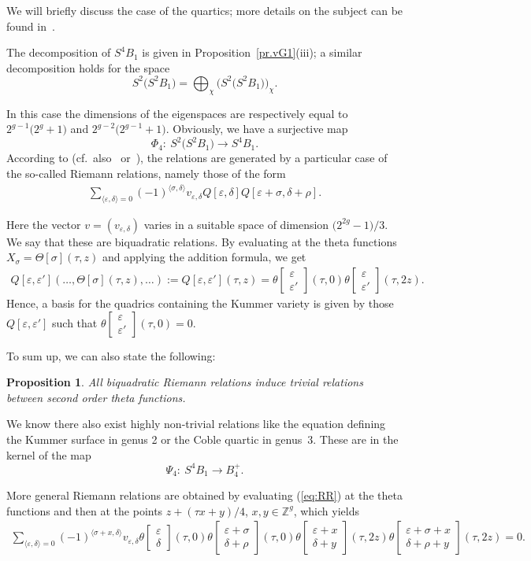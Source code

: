 \documentclass[11pt]{article}
\numberwithin{equation}{section}
\numberwithin{equation}{section}
\newtheorem{Proposition}[Theorem]{Proposition}
{ \theoremstyle{definition}
\newtheorem{Remark}[Theorem]{Remark} }
\newcommand{\de}{\delta}
\newcommand{\ep}{\varepsilon}
\newcommand{\ZZ}{{\mathbb{Z}}}
\def\ZZ{{\mathbb Z}}
\def\t{\theta}
\def\s{\sigma}
\def\r{\rho}
\def\T{\Theta}
\def\tt#1#2{{\t\left[\begin{matrix}{#1}\\ {#2}\end{matrix}\right]}}
\begin{document}
We will briefly discuss the case of the quartics; more details on the subject can be found in~\cite{vG}.

The decomposition of $S^4B_1$ is given in Proposition~\ref{pr.vG1}(iii); a similar decomposition holds for the space
\[
S^2\big(S^2B_1\big)=\bigoplus_{\chi} \big(S^2\big(S^2B_1\big)\big)_{\chi}.
\]

In this case the dimensions of the eigenspaces are respectively equal to $2^{g-1} \big(2^g+1\big)$ and $2^{g-2}\big(2^{g-1}+1\big)$. Obviously, we have a surjective map
\[
 \Phi_4\colon \ S^2\big(S^2B_1\big)\to S^4B_1.
\]
 According to \cite{fay} (cf.\ also~\cite{APS} or~\cite{FGS}), the relations are generated by a particular case of the so-called Riemann relations, namely those of the form
\begin{gather}\label{eq:RR}
\sum_{\langle\ep,\de\rangle =0} (-1)^{\langle \s, \de\rangle} v_{\ep,\de}Q[\ep, \de]Q[\ep+\s, \de+\r] .
\end{gather}

Here the vector $v=( v_{\ep,\de})$ varies in a suitable space of dimension $\big(2^{2g}-1\big)/3$. We say that these are biquadratic relations. By evaluating at the theta functions
$X_{\s}=\T[\s](\tau,z)$ and applying the addition formula, we get
\begin{gather}\label{eq:vT}
Q[\ep, \ep'](\dots,\T[\s](\tau,z),\dots):=Q[\ep, \ep'](\tau, z) =\tt \ep {\ep'} (\tau, 0)\tt \ep {\ep'} (\tau, 2z).
 \end{gather}
Hence, a basis for the quadrics containing the Kummer variety is given by those $Q[\ep, \ep']$ such that
$\theta\left[\begin{smallmatrix}\ep \\ \ep' \end{smallmatrix}\right] (\tau, 0)=0$.

To sum up, we can also state the following:

\begin{Proposition} \label{trivial relations}
All biquadratic Riemann relations induce trivial relations between second order theta functions.
\end{Proposition}

 We know there also exist highly non-trivial relations like the equation defining the Kummer surface in genus 2 or the Coble quartic in genus~3. These are in the kernel of the map
\[
\Psi_4\colon \ S^4B_1\to B_4^+.
\]
\begin{Remark} More general Riemann relations are obtained by evaluating (\ref{eq:RR}) at the theta functions and then at the points $z+(\tau x+y)/4$, $x,y \in\ZZ^g$, which yields
\begin{gather}\label{eq:RR2}
\sum_{\langle\ep,\de\rangle =0}\! (-1)^{\langle\s+x, \de\rangle } v_{\ep,\de} \tt\ep\de(\tau,0)\tt{\ep+\s }{\de+\r}(\tau,0)\tt{\ep+x}{\de+y}(\tau,2z)\tt{\ep+\s+x}{\de+\r+y}(\tau,2z)=0.\!\!\!
\end{gather}
\end{Remark}
\end{document}
